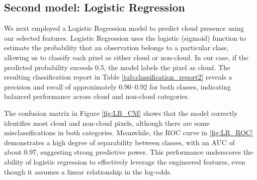 \documentclass[11pt,letterpaper]{article}
\begin{document}



\vspace{1em} %
\subsection{Second model: Logistic Regression}
\vspace{0.5em} %

We next employed a Logistic Regression model to predict cloud presence using our selected features. Logistic Regression uses the logistic (sigmoid) function to estimate the probability that an observation belongs to a particular class, allowing us to classify each pixel as either cloud or non-cloud. In our case, if the predicted probability exceeds 0.5, the model labels the pixel as cloud. The resulting classification report in Table \ref{tab:classification_report2} reveals a precision and recall of approximately 0.90–0.92 for both classes, indicating balanced performance across cloud and non-cloud categories.

The confusion matrix in Figure \ref{fig:LR_CM} shows that the model correctly identifies most cloud and non-cloud pixels, although there are some misclassifications in both categories. Meanwhile, the ROC curve in \ref{fig:LR_ROC} demonstrates a high degree of separability between classes, with an AUC of about 0.97, suggesting strong predictive power. This performance underscores the ability of logistic regression to effectively leverage the engineered features, even though it assumes a linear relationship in the log-odds.
\end{document}
